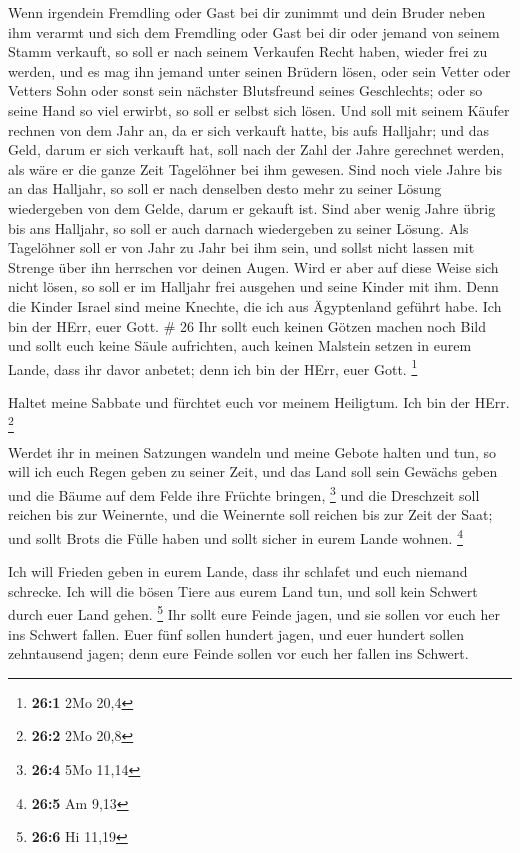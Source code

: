  Wenn irgendein Fremdling oder Gast bei dir zunimmt und
dein Bruder neben ihm verarmt und sich dem Fremdling oder Gast bei dir
oder jemand von seinem Stamm verkauft,  so soll er nach
seinem Verkaufen Recht haben, wieder frei zu werden, und es mag ihn
jemand unter seinen Brüdern lösen,  oder sein Vetter oder
Vetters Sohn oder sonst sein nächster Blutsfreund seines Geschlechts;
oder so seine Hand so viel erwirbt, so soll er selbst sich lösen.
 Und soll mit seinem Käufer rechnen von dem Jahr an, da er
sich verkauft hatte, bis aufs Halljahr; und das Geld, darum er sich
verkauft hat, soll nach der Zahl der Jahre gerechnet werden, als wäre er
die ganze Zeit Tagelöhner bei ihm gewesen.  Sind noch viele
Jahre bis an das Halljahr, so soll er nach denselben desto mehr zu
seiner Lösung wiedergeben von dem Gelde, darum er gekauft ist.
 Sind aber wenig Jahre übrig bis ans Halljahr, so soll er
auch darnach wiedergeben zu seiner Lösung.  Als Tagelöhner
soll er von Jahr zu Jahr bei ihm sein, und sollst nicht lassen mit
Strenge über ihn herrschen vor deinen Augen.  Wird er aber
auf diese Weise sich nicht lösen, so soll er im Halljahr frei ausgehen
und seine Kinder mit ihm.  Denn die Kinder Israel sind
meine Knechte, die ich aus Ägyptenland geführt habe. Ich bin der HErr,
euer Gott. \# 26  Ihr sollt euch keinen Götzen machen noch
Bild und sollt euch keine Säule aufrichten, auch keinen Malstein setzen
in eurem Lande, dass ihr davor anbetet; denn ich bin der HErr, euer
Gott. \footnote{\textbf{26:1} 2Mo 20,4}

 Haltet meine Sabbate und fürchtet euch vor meinem
Heiligtum. Ich bin der HErr. \footnote{\textbf{26:2} 2Mo 20,8}

 Werdet ihr in meinen Satzungen wandeln und meine Gebote
halten und tun,  so will ich euch Regen geben zu seiner
Zeit, und das Land soll sein Gewächs geben und die Bäume auf dem Felde
ihre Früchte bringen, \footnote{\textbf{26:4} 5Mo 11,14} 
und die Dreschzeit soll reichen bis zur Weinernte, und die Weinernte
soll reichen bis zur Zeit der Saat; und sollt Brots die Fülle haben und
sollt sicher in eurem Lande wohnen. \footnote{\textbf{26:5} Am 9,13}

 Ich will Frieden geben in eurem Lande, dass ihr schlafet
und euch niemand schrecke. Ich will die bösen Tiere aus eurem Land tun,
und soll kein Schwert durch euer Land gehen. \footnote{\textbf{26:6} Hi
  11,19}  Ihr sollt eure Feinde jagen, und sie sollen vor
euch her ins Schwert fallen.  Euer fünf sollen hundert
jagen, und euer hundert sollen zehntausend jagen; denn eure Feinde
sollen vor euch her fallen ins Schwert.

